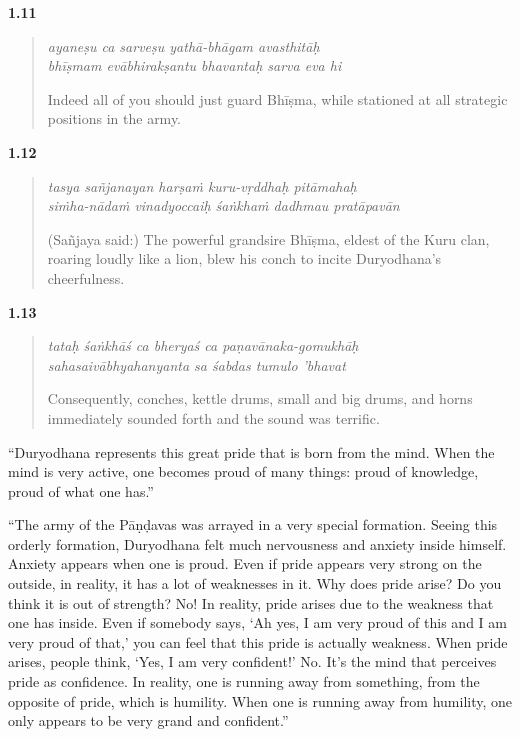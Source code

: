 \par\noindent\textbf{1.11}\par
\begin{verse}
\textit{ayaneṣu ca sarveṣu yathā-bhāgam avasthitāḥ} \\
\textit{bhīṣmam evābhirakṣantu bhavantaḥ sarva eva hi}

\noindent Indeed all of you should just guard Bhīṣma, while stationed at all strategic positions in the army.
\end{verse}
\par



\par\noindent\textbf{1.12}\par
\begin{verse}
\textit{tasya sañjanayan harṣaṁ kuru-vṛddhaḥ pitāmahaḥ} \\
\textit{siṁha-nādaṁ vinadyoccaiḥ śaṅkhaṁ dadhmau pratāpavān}

\noindent (Sañjaya said:) The powerful grandsire Bhīṣma, eldest of the Kuru clan, roaring loudly like a lion, blew his conch to incite Duryodhana's cheerfulness.
\end{verse}
\par



\par\noindent\textbf{1.13}\par
\begin{verse}
\textit{tataḥ śaṅkhāś ca bheryaś ca paṇavānaka-gomukhāḥ} \\
\textit{sahasaivābhyahanyanta sa śabdas tumulo ’bhavat}

\noindent Consequently, conches, kettle drums, small and big drums, and horns immediately sounded forth and the sound was terrific.
\end{verse}
\par



\enquote{Duryodhana represents this great pride that is born from the mind. When the mind is very active, one becomes proud of many things: proud of knowledge, proud of what one has.}

\enquote{The army of the Pāṇḍavas was arrayed in a very special formation. Seeing this orderly formation, Duryodhana felt much nervousness and anxiety inside himself. Anxiety appears when one is proud. Even if pride appears very strong on the outside, in reality, it has a lot of weaknesses in it. Why does pride arise? Do you think it is out of strength? No! In reality, pride arises due to the weakness that one has inside. Even if somebody says, \enquote{Ah yes, I am very proud of this and I am very proud of that,} you can feel that this pride is actually weakness. When pride arises, people think, \enquote{Yes, I am very confident!} No. It’s the mind that perceives pride as confidence. In reality, one is running away from something, from the opposite of pride, which is humility. When one is running away from humility, one only appears to be very grand and confident.}

